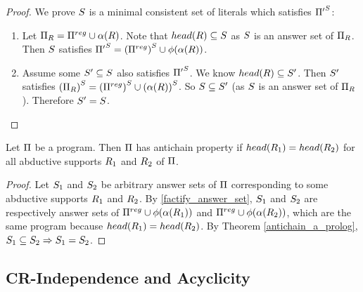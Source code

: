 \documentclass{paper}
\begin{document}
\begin{flushleft}
\begin{proof}
We prove $S$ is a minimal consistent set of literals
which satisfies ${{\Pi}'}^{S}$:
\begin{enumerate}
\item
Let $\Pi_{R} = \Pi^{reg} \cup \alpha(R)$.
Note that $head(R) \subseteq S$ as $S$ is an answer
set of $\Pi_{R}$.
Then $S$ satisfies
${{\Pi}'}^{S} =
{(\Pi^{reg})}^{S} \cup \phi(\alpha(R))$.
\item
Assume some ${S}' \subseteq S$ also satisfies
${{\Pi}'}^{S}$.
We know $head(R) \subseteq {S}'$.
Then ${S}'$ satisfies
${(\Pi_{R})}^{S} =
{(\Pi^{reg})}^{S} \cup {(\alpha(R))}^{S}$.
So $S \subseteq {S}'$
(as $S$ is an answer set of
$\Pi_{R}$). Therefore ${S}' = S$.
\end{enumerate}

\end{proof}

\begin{proposition}
\label{same_abductive_support_heads}

Let $\Pi$ be a \cp{} program.
Then $\Pi$ has antichain property if
$head({R}_{1}) = head({R}_{2})$ for
all abductive supports ${R}_{1}$ and ${R}_{2}$ of $\Pi$.

\end{proposition}

\begin{proof}

Let ${S}_{1}$ and ${S}_{2}$ be arbitrary answer sets of
$\Pi$ corresponding to
some abductive supports ${R}_{1}$ and ${R}_{2}$.
By \ref{factify_answer_set}, ${S}_{1}$ and ${S}_{2}$ are
respectively answer sets of
$\Pi^{reg} \cup \phi(\alpha({R}_{1}))$ and
$\Pi^{reg} \cup \phi(\alpha({R}_{2}))$,
which are the same \ap{} program because
$head({R}_{1}) = head({R}_{2})$.
By Theorem \ref{antichain_a_prolog},
${S}_{1} \subseteq {S}_{2} \Rightarrow {S}_{1} = {S}_{2}$.

\end{proof}

\subsection{CR-Independence and Acyclicity}

\begin{definition}


\end{definition}
\end{flushleft}
\end{document}
